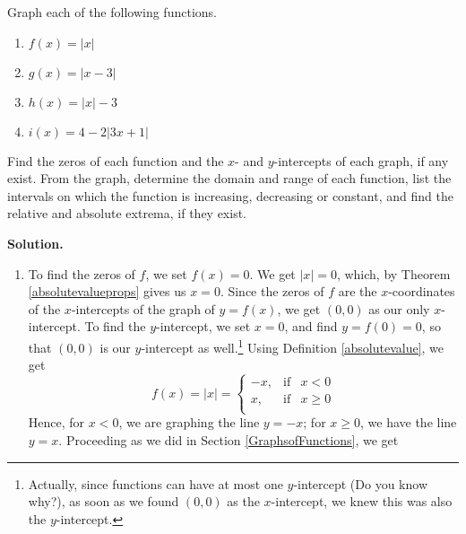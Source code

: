 \begin{ex} Graph each of the following functions.  
\enlargethispage{.5in}
\vspace{-.1in}
\begin{multicols}{4}

\begin{enumerate}

\item  $f(x) = |x|$
\item  $g(x) = |x-3|$
\item  $h(x) = |x| -3$
\item  \small $i(x) = 4 - 2|3x+1|$ \normalsize

\end{enumerate}

\end{multicols}
\vspace{-.2in}

Find the zeros of each function and the $x$- and $y$-intercepts of  each graph, if any exist.  From the graph, determine the domain and range of each function, list the intervals on which the function is increasing, decreasing  or constant, and find the relative and absolute extrema, if they exist.

\medskip

{\bf Solution.}  

\begin{enumerate}

\item  To find the zeros of $f$, we set $f(x)= 0$.  We get $|x|=0$, which, by Theorem \ref{absolutevalueprops} gives us $x=0$.  Since the zeros of $f$ are the $x$-coordinates of the $x$-intercepts of the graph of $y=f(x)$, we get $(0,0)$ as our only $x$-intercept.  To find the $y$-intercept, we set $x=0$, and find $y = f(0) = 0$, so that $(0,0)$ is our $y$-intercept as well.\footnote{Actually, since functions can have at most one $y$-intercept (Do you know why?), as soon as we found $(0,0)$ as the $x$-intercept, we knew this was also the $y$-intercept.}  Using Definition \ref{absolutevalue}, we get \[ f(x) = |x| =  \left\{ \begin{array}{rcl} -x, & \mbox{if} & x < 0  \\ x, & \mbox{if} & x \geq 0 \\ \end{array} \right.\]  Hence, for $x < 0$, we are graphing the line $y = -x$;  for $x \geq 0$, we have the line $y = x$.  Proceeding as we did in Section \ref{GraphsofFunctions}, we get


\end{enumerate}
\end{ex}
